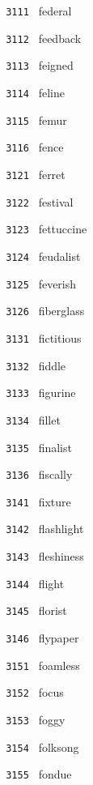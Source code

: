 \documentclass[11pt]{article}
\begin{document}
\begin{multicols}{6}
\footnotesize
\noindent \texttt{ 3111 } federal  \par
\noindent \texttt{ 3112 } feedback  \par
\noindent \texttt{ 3113 } feigned  \par
\noindent \texttt{ 3114 } feline  \par
\noindent \texttt{ 3115 } femur  \par
\noindent \texttt{ 3116 } fence  \par
\vspace{3mm}
\noindent \texttt{ 3121 } ferret  \par
\noindent \texttt{ 3122 } festival  \par
\noindent \texttt{ 3123 } fettuccine  \par
\noindent \texttt{ 3124 } feudalist  \par
\noindent \texttt{ 3125 } feverish  \par
\noindent \texttt{ 3126 } fiberglass  \par
\vspace{3mm}
\noindent \texttt{ 3131 } fictitious  \par
\noindent \texttt{ 3132 } fiddle  \par
\noindent \texttt{ 3133 } figurine  \par
\noindent \texttt{ 3134 } fillet  \par
\noindent \texttt{ 3135 } finalist  \par
\noindent \texttt{ 3136 } fiscally  \par
\vspace{3mm}
\noindent \texttt{ 3141 } fixture  \par
\noindent \texttt{ 3142 } flashlight  \par
\noindent \texttt{ 3143 } fleshiness  \par
\noindent \texttt{ 3144 } flight  \par
\noindent \texttt{ 3145 } florist  \par
\noindent \texttt{ 3146 } flypaper  \par
\vspace{3mm}
\noindent \texttt{ 3151 } foamless  \par
\noindent \texttt{ 3152 } focus  \par
\noindent \texttt{ 3153 } foggy  \par
\noindent \texttt{ 3154 } folksong  \par
\noindent \texttt{ 3155 } fondue  \par

\end{multicols}
\end{document}
